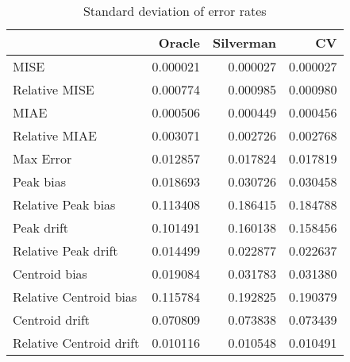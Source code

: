 \begin{table}[H]
\centering
\begin{tabular}{lrrr}
  \hline
 & Oracle & Silverman & CV \\ 
  \hline
MISE & 0.000021 & 0.000027 & 0.000027 \\ 
  Relative MISE & 0.000774 & 0.000985 & 0.000980 \\ 
  MIAE & 0.000506 & 0.000449 & 0.000456 \\ 
  Relative MIAE & 0.003071 & 0.002726 & 0.002768 \\ 
  Max Error & 0.012857 & 0.017824 & 0.017819 \\ 
  Peak bias & 0.018693 & 0.030726 & 0.030458 \\ 
  Relative Peak bias & 0.113408 & 0.186415 & 0.184788 \\ 
  Peak drift & 0.101491 & 0.160138 & 0.158456 \\ 
  Relative Peak drift & 0.014499 & 0.022877 & 0.022637 \\ 
  Centroid bias & 0.019084 & 0.031783 & 0.031380 \\ 
  Relative Centroid bias & 0.115784 & 0.192825 & 0.190379 \\ 
  Centroid drift & 0.070809 & 0.073838 & 0.073439 \\ 
  Relative Centroid drift & 0.010116 & 0.010548 & 0.010491 \\ 
   \hline
\end{tabular}
\caption{Standard deviation of error rates} 
\label{tbl:stddev_error_rates}
\end{table}

